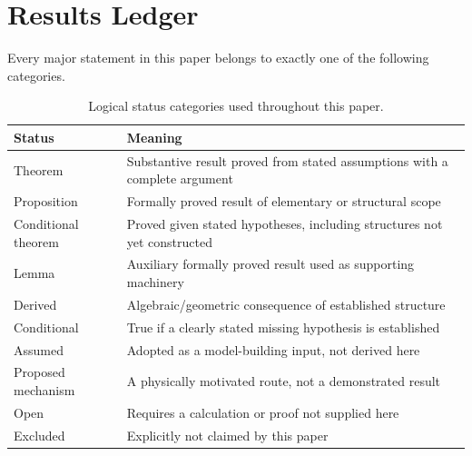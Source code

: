 \documentclass[11pt]{article}
\theoremstyle{canonmath}
\theoremstyle{canonpostulate}
\theoremstyle{canonclaim}
\begin{document}
\section*{Results Ledger}
Every major statement in this paper belongs to exactly one of the following categories.

\begin{table}[H]
\centering
\caption{Logical status categories used throughout this paper.}
\begin{tabular}{@{}ll@{}}
\toprule
\textbf{Status} & \textbf{Meaning} \\
\midrule
Theorem & Substantive result proved from stated assumptions with a complete argument \\
Proposition & Formally proved result of elementary or structural scope \\
Conditional theorem & Proved given stated hypotheses, including structures not yet constructed \\
Lemma & Auxiliary formally proved result used as supporting machinery \\
Derived & Algebraic/geometric consequence of established structure \\
Conditional & True if a clearly stated missing hypothesis is established \\
Assumed & Adopted as a model-building input, not derived here \\
Proposed mechanism & A physically motivated route, not a demonstrated result \\
Open & Requires a calculation or proof not supplied here \\
Excluded & Explicitly not claimed by this paper \\
\bottomrule
\end{tabular}
\end{table}
\end{document}
